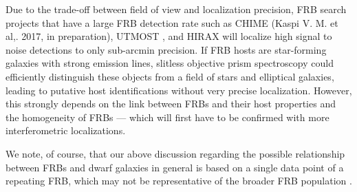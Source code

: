 \documentclass[twocolumn]{aastex61}
\def \frb {FRB\,121102}
\begin{document}
 Due to the trade-off between field of view and localization precision, FRB search projects that have a large FRB detection rate such as CHIME (Kaspi V. M. et al,. 2017, in preparation), UTMOST \citep{cfb+16}, and HIRAX \citep{nbb+16} will localize high signal to noise detections to only sub-arcmin precision. If FRB hosts are star-forming galaxies with strong emission lines, slitless objective prism spectroscopy could efficiently distinguish these objects from a field of stars and elliptical galaxies, leading to putative host identifications without very precise localization. However, this strongly depends on the link between FRBs and their host properties and the homogeneity of FRBs --- which will first have to be confirmed with more interferometric localizations.


We note, of course, that our above discussion regarding the possible relationship between FRBs and dwarf galaxies in general is based on a single data point of a repeating FRB, which may not be representative of the broader FRB population \citep[see][for more details]{ssh+16a,ssh+16b}. 




\end{document}
